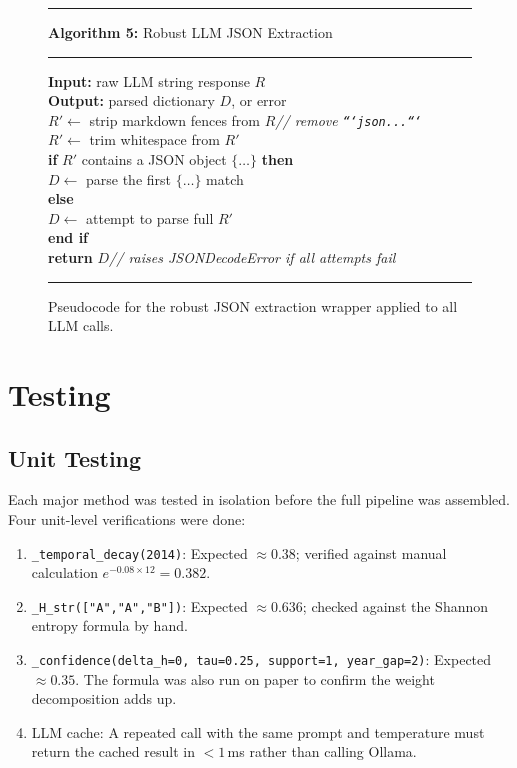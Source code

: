 \begin{figure}[H]
\centering
\begin{minipage}{0.82\textwidth}
\hrule\vspace{4pt}
\textbf{Algorithm 5:} Robust LLM JSON Extraction
\vspace{4pt}\hrule\vspace{6pt}
\textbf{Input:} raw LLM string response $R$\\
\textbf{Output:} parsed dictionary $D$, or error\\[4pt]
$R' \leftarrow$ strip markdown fences from $R$\hfill\textit{// remove \texttt{```json...```}}\\
$R' \leftarrow$ trim whitespace from $R'$\\
\textbf{if} $R'$ contains a JSON object $\{\ldots\}$ \textbf{then}\\
\hspace*{1.2em}$D \leftarrow$ parse the first $\{\ldots\}$ match\\
\textbf{else}\\
\hspace*{1.2em}$D \leftarrow$ attempt to parse full $R'$\\
\textbf{end if}\\
\textbf{return} $D$\hfill\textit{// raises JSONDecodeError if all attempts fail}
\vspace{6pt}\hrule
\end{minipage}
\caption{Pseudocode for the robust JSON extraction wrapper applied to all LLM calls.}
\label{alg:json}
\end{figure}

\section{Testing}

\subsection{Unit Testing}

Each major method was tested in isolation before the full pipeline was assembled.
Four unit-level verifications were done:

\begin{enumerate}
    \item \texttt{\_temporal\_decay(2014)}: Expected $\approx 0.38$; verified
    against manual calculation $e^{-0.08 \times 12} = 0.382$.
    \item \texttt{\_H\_str(["A","A","B"])}: Expected $\approx 0.636$; checked
    against the Shannon entropy formula by hand.
    \item \texttt{\_confidence(delta\_h=0, tau=0.25, support=1, year\_gap=2)}:
    Expected $\approx 0.35$. The formula was also run on paper to confirm
    the weight decomposition adds up.
    \item LLM cache: A repeated call with the same prompt and temperature
    must return the cached result in $< 1$\,ms rather than calling Ollama.
\end{enumerate}

